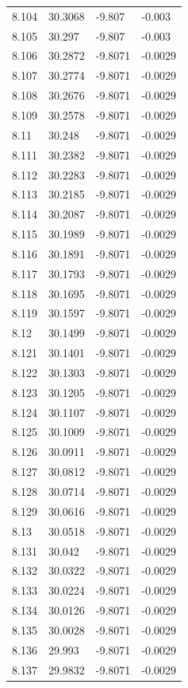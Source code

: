 \begin{tabular}{llll}
8.104 & 30.3068 & -9.807 & -0.003 \\
8.105 & 30.297 & -9.807 & -0.003 \\
8.106 & 30.2872 & -9.8071 & -0.0029 \\
8.107 & 30.2774 & -9.8071 & -0.0029 \\
8.108 & 30.2676 & -9.8071 & -0.0029 \\
8.109 & 30.2578 & -9.8071 & -0.0029 \\
8.11 & 30.248 & -9.8071 & -0.0029 \\
8.111 & 30.2382 & -9.8071 & -0.0029 \\
8.112 & 30.2283 & -9.8071 & -0.0029 \\
8.113 & 30.2185 & -9.8071 & -0.0029 \\
8.114 & 30.2087 & -9.8071 & -0.0029 \\
8.115 & 30.1989 & -9.8071 & -0.0029 \\
8.116 & 30.1891 & -9.8071 & -0.0029 \\
8.117 & 30.1793 & -9.8071 & -0.0029 \\
8.118 & 30.1695 & -9.8071 & -0.0029 \\
8.119 & 30.1597 & -9.8071 & -0.0029 \\
8.12 & 30.1499 & -9.8071 & -0.0029 \\
8.121 & 30.1401 & -9.8071 & -0.0029 \\
8.122 & 30.1303 & -9.8071 & -0.0029 \\
8.123 & 30.1205 & -9.8071 & -0.0029 \\
8.124 & 30.1107 & -9.8071 & -0.0029 \\
8.125 & 30.1009 & -9.8071 & -0.0029 \\
8.126 & 30.0911 & -9.8071 & -0.0029 \\
8.127 & 30.0812 & -9.8071 & -0.0029 \\
8.128 & 30.0714 & -9.8071 & -0.0029 \\
8.129 & 30.0616 & -9.8071 & -0.0029 \\
8.13 & 30.0518 & -9.8071 & -0.0029 \\
8.131 & 30.042 & -9.8071 & -0.0029 \\
8.132 & 30.0322 & -9.8071 & -0.0029 \\
8.133 & 30.0224 & -9.8071 & -0.0029 \\
8.134 & 30.0126 & -9.8071 & -0.0029 \\
8.135 & 30.0028 & -9.8071 & -0.0029 \\
8.136 & 29.993 & -9.8071 & -0.0029 \\
8.137 & 29.9832 & -9.8071 & -0.0029 \\

\end{tabular}
